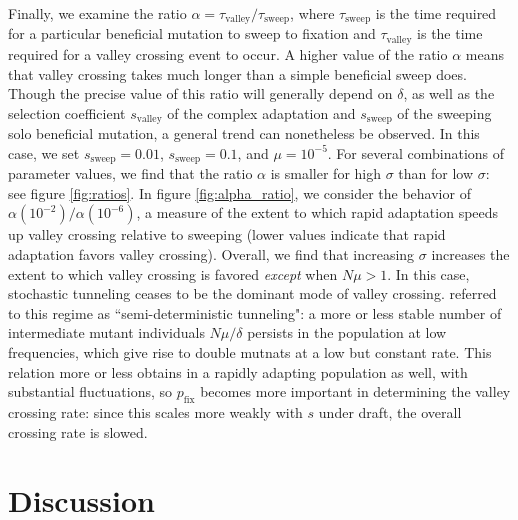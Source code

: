 \documentclass[rmp]{revtex4}
\begin{document}
Finally, we examine the ratio $\alpha = \tau_{\mathrm{valley}}/\tau_{\mathrm{sweep}}$, where $\tau_{\mathrm{sweep}}$ is the time required for a particular beneficial mutation to sweep to fixation and $\tau_{\mathrm{valley}}$ is the time required for a valley crossing event to occur.
A higher value of the ratio $\alpha$ means that valley crossing takes much longer than a simple beneficial sweep does.
Though the precise value of this ratio will generally depend on $\delta$, as well as the selection coefficient $s_{\mathrm{valley}}$ of the complex adaptation and $s_{\mathrm{sweep}}$ of the sweeping solo beneficial mutation, a general trend can nonetheless be observed.
In this case, we set $s_{\mathrm{sweep}} = 0.01$, $s_{\mathrm{sweep}} = 0.1$, and $\mu = 10^{-5}$.
For several combinations of parameter values, we find that the ratio $\alpha$ is smaller for high $\sigma$ than for low $\sigma$: see figure \ref{fig:ratios}.
In figure \ref{fig:alpha_ratio}, we consider the behavior of $\alpha(10^{-2})/\alpha(10^{-6})$, a measure of the extent to which rapid adaptation speeds up valley crossing relative to sweeping (lower values indicate that rapid adaptation favors valley crossing).
Overall, we find that increasing $\sigma$ increases the extent to which valley crossing is favored \emph{except} when $N\mu > 1$.
In this case, stochastic tunneling ceases to be the dominant mode of valley crossing.
\citet{weissman_2009} referred to this regime as ``semi-deterministic tunneling": a more or less stable number of intermediate mutant individuals $N\mu/\delta$ persists in the population at low frequencies, which give rise to double mutnats at a low but constant rate.
This relation more or less obtains in a rapidly adapting population as well, with substantial fluctuations, so $p_{\mathrm{fix}}$ becomes more important in determining the valley crossing rate: since this scales more weakly with $s$ under draft, the overall crossing rate is slowed.

\section*{Discussion}
\end{document}
